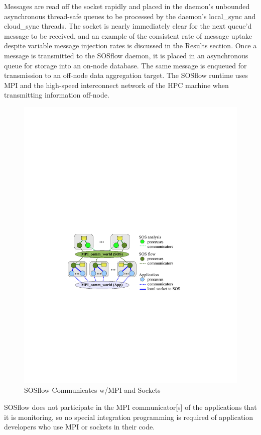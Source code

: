 %
Messages are read off the socket rapidly and placed in the daemon's
unbounded asynchronous thread-safe queues to be processed by the
daemon's local\_sync and cloud\_sync threads.
%
The socket is nearly immediately clear for the next queue'd message to
be received, and an example of the consistent rate of message uptake
despite variable message injection rates is discussed in the Results
section.
%
Once a message is transmitted to the SOSflow daemon, it is placed in
an asynchronous queue for storage into an on-node database.
%
The same message is enqueued for transmission to an off-node data
aggregation target.
%
The SOSflow runtime uses MPI and the high-speed interconnect network
of the HPC machine when transmitting information off-node.
\begin{figure}[h]
  \centering
  \includegraphics[width=\columnwidth]{images/sos-mpmd.pdf}
  \caption{SOSflow Communicates w/MPI and Sockets}
  \label{fig_sos_mpmd}
\end{figure}
%
SOSflow does not participate in the MPI communicator[s] of the
applications that it is monitoring, so no special integration
programming is required of application developers who use MPI or
sockets in their code.
%
\par
%
%
